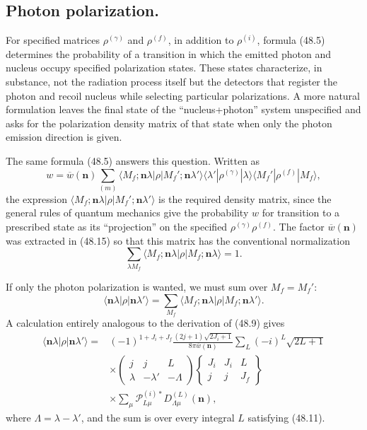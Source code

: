 \subsection*{Photon polarization.} For specified matrices $\rho^{(\gamma)}$ and $\rho^{(f)}$, in addition to $\rho^{(i)}$, formula (48.5) determines the probability of a transition in which the emitted photon and nucleus occupy specified polarization states. These states characterize, in substance, not the radiation process itself but the detectors that register the photon and recoil nucleus while selecting particular polarizations. A more natural formulation leaves the final state of the ``nucleus+photon'' system unspecified and asks for the polarization density matrix of that state when only the photon emission direction is given.

The same formula (48.5) answers this question. Written as
\begin{equation}
w=\overline w(\mathbf n)\sum_{(m)}
\langle M_f;\mathbf n\lambda|\rho|M_f';\mathbf n\lambda'\rangle
\langle\lambda'|\rho^{(\gamma)}|\lambda\rangle
\langle M_f'|\rho^{(f)}|M_f\rangle,
\tag{48.15}
\end{equation}
the expression $\langle M_f;\mathbf n\lambda|\rho|M_f';\mathbf n\lambda'\rangle$ is the required density matrix, since the general rules of quantum mechanics give the probability $w$ for transition to a prescribed state as its
``projection'' on the specified $\rho^{(\gamma)}\rho^{(f)}$. The factor $\overline w(\mathbf n)$ was extracted in (48.15) so that this matrix has the conventional normalization
\[
\sum_{\lambda M_f}\langle M_f;\mathbf n\lambda|\rho|M_f;\mathbf n\lambda\rangle=1.
\]

If only the photon polarization is wanted, we must sum over $M_f=M_f'$:
\[
\langle\mathbf n\lambda|\rho|\mathbf n\lambda'\rangle
=\sum_{M_f}\langle M_f;\mathbf n\lambda|\rho|M_f;\mathbf n\lambda'\rangle.
\]
A calculation entirely analogous to the derivation of (48.9) gives
\begin{equation}
\begin{split}
\langle\mathbf n\lambda|\rho|\mathbf n\lambda'\rangle
={}&(-1)^{1+J_i+J_f}\frac{(2j+1)\sqrt{2J_i+1}}
{8\pi\overline w(\mathbf n)}
\sum_L(-i)^L\sqrt{2L+1}\\
&\times
\begin{pmatrix}j&j&L\\\lambda&-\lambda'&-\Lambda\end{pmatrix}
\left\{\begin{matrix}J_i&J_i&L\\j&j&J_f\end{matrix}\right\}\\
&\times\sum_\mu\mathcal P_{L\mu}^{(i)*}D_{\Lambda\mu}^{(L)}(\mathbf n),
\end{split}
\tag{48.16}
\end{equation}
where $\Lambda=\lambda-\lambda'$, and the sum is over every integral $L$ satisfying (48.11).

